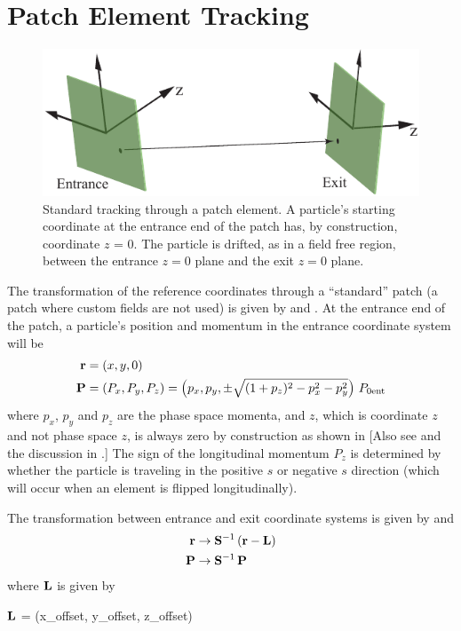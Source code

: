 \section{Patch Element Tracking}
\label{s:patch.std}

\begin{figure}[tb]
  \centering
  \includegraphics[width=5in]{patch.pdf}
  \caption[Standard patch transformation.]
{Standard tracking through a patch element. A particle's starting coordinate at
the entrance end of the patch has, by construction, coordinate $z$ =
0. The particle is drifted, as in a field free region, between the
entrance $z = 0$ plane and the exit $z = 0$ plane.}
  \label{f:patch.track}
\end{figure}


The transformation of the reference coordinates through a ``standard''
patch (a patch where custom fields are not used) is given by
 and . At the entrance end of the patch, a
particle's position and momentum in the entrance coordinate system will be
\begin{alignat}{1}
  {\bf r} &= (x, y, 0) \nonumber \\
  {\bf P} &= (P_x, P_y, P_z) = 
    \left( p_x, p_y, \pm \sqrt{(1+p_z)^2 - p_x^2 - p_y^2} \right) \, P_{0\text{ent}}
\end{alignat}
where $p_x$, $p_y$ and $p_z$ are the phase space momenta, and $z$,
which is coordinate $z$ and not phase space $z$, is always zero by
construction as shown in  [Also see 
and the discussion in .] The sign of the
longitudinal momentum $P_z$ is determined by whether the particle is
traveling in the positive $s$ or negative $s$ direction (which will
occur when an element is flipped longitudinally).

The transformation between entrance and exit coordinate systems is given by  and 
\begin{alignat}{1}
  {\bf r} &\rightarrow 
    {\bf S}^{-1} \, ({\bf r} - {\bf L}) \nonumber \\
  {\bf P} &\rightarrow {\bf S}^{-1} \, {\bf P}
\end{alignat}
where $\bf L$ is given by 
\begin{example}
  \(\bf L\) =  (x_offset, y_offset, z_offset)
  \label{lxyz2}
\end{example}

